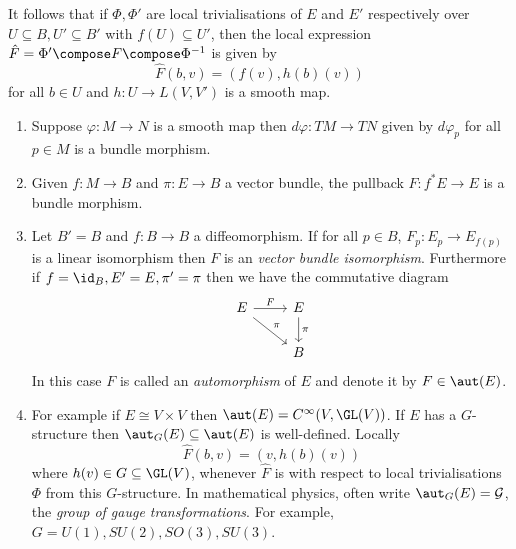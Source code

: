 \documentclass[a4paper]{article}
\begin{document}
It follows that if \(\Phi, \Phi'\) are local trivialisations of \(E\) and \(E'\) respectively over \(U \subseteq B, U' \subseteq B'\) with \(f(U) \subseteq U'\), then the local expression \(\hat F = \Phi' \compose F \compose \Phi^{-1}\) is given by
\[
  \hat F(b, v) = (f(v), h(b)(v))
\]
for all \(b \in U\) and \(h: U \to L(V, V')\) is a smooth map.

\begin{eg}\leavevmode
  \begin{enumerate}
  \item Suppose \(\varphi: M \to N\) is a smooth map then \(d \varphi: TM \to TN\) given by \(d\varphi_p\) for all \(p \in M\) is a bundle morphism.
  \item Given \(f: M \to B\) and \(\pi: E \to B\) a vector bundle, the pullback \(F: f^*E \to E\) is a bundle morphism.
  \item Let \(B' = B\) and \(f: B \to B\) a diffeomorphism. If for all \(p \in B\), \(F_p: E_p \to E_{f(p)}\) is a linear isomorphism then \(F\) is an \emph{vector bundle isomorphism}. Furthermore if \(f = \id_B, E' = E, \pi' = \pi\) then we have the commutative diagram
    \[
      \begin{tikzcd}
        E \ar[r, "F"] \ar[dr, "\pi"] & E \ar[d, "\pi"] \\
        & B
      \end{tikzcd}
    \]
    In this case \(F\) is called an \emph{automorphism} of \(E\) and denote it by \(F \in \aut(E)\).
  \item For example if \(E \cong V \times V\) then \(\aut(E) = C^\infty(V, \GL(V))\). If \(E\) has a \(G\)-structure then \(\aut_G(E) \subseteq \aut(E)\) is well-defined. Locally
    \[
      \hat F(b, v) = (v, h(b)(v))
    \]
    where \(h(v) \in G \subseteq \GL(V)\), whenever \(\hat F\) is with respect to local trivialisations \(\Phi\) from this \(G\)-structure. In mathematical physics, often write \(\aut_G(E) = \mathcal G\), the \emph{group of gauge transformations}. For example, \(G = U(1), SU(2), SO(3), SU(3)\).
  \end{enumerate}
\end{eg}




  
















\printindex
\end{document}
